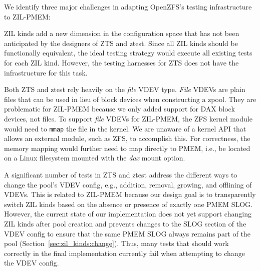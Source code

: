 \documentclass[12pt,a4paper,twoside]{book}
\begin{document}
We identify three major challenges in adapting OpenZFS's testing infrastructure to ZIL-PMEM:
\begin{description}[noitemsep]
    \item[Dimensionality] ZIL kinds add a new dimension in the configuration space that has not been anticipated by the designers of ZTS and ztest.
        Since all ZIL kinds should be functionally equivalent, the ideal testing strategy would execute all existing tests for each ZIL kind.
        However, the testing harnesses for ZTS does not have the infrastructure for this task.

    \item[File VDEVs] Both ZTS and ztest rely heavily on the \textit{file} VDEV type.
        \textit{File} VDEVs are plain files that can be used in lieu of block devices when constructing a zpool.
        They are problematic for ZIL-PMEM because we only added support for DAX block devices, not files.
        To support \textit{file} VDEVs for ZIL-PMEM, the ZFS kernel module would need to \lstinline{mmap} the file in the kernel.
        We are unaware of a kernel API that allows an external module, such as ZFS, to accomplish this.
        For correctness, the memory mapping would further need to map directly to PMEM, i.e., be located on a Linux filesystem mounted with the \textit{dax} mount option.

    \item[VDEV Management]
        A significant number of tests in ZTS and ztest address the different ways to change the pool's VDEV config, e.g., addition, removal, growing, and offlining of VDEVs.
        This is related to ZIL-PMEM because our design goal is to transparently switch ZIL kinds based on the absence or presence of exactly one PMEM SLOG.
        However, the current state of our implementation does not yet support changing ZIL kinds after pool creation and prevents changes to the SLOG section of the VDEV config to ensure that the same PMEM SLOG always remains part of the pool (Section~\ref{sec:zil_kinds:change}).
        Thus, many tests that should work correctly in the final implementation currently fail when attempting to change the VDEV config.
\end{description}
\end{document}
